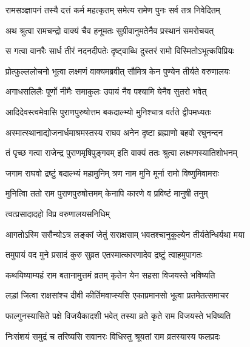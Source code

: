 \twolineshloka
{रामसञ्ज्ञापनं तस्यै दत्तं कर्म महत्कृतम्}
{समेत्य रामेण पुनः सर्व तत्र निवेदितम्} %

\twolineshloka
{अथ श्रुत्वा रामचन्द्रो वाक्यं चैव हनूमतः}
{सुग्रीवानुमतेनैव प्रस्थानं समरोचयत्} %

\twolineshloka
{स गत्वा वानरैः सार्ध तीरं नदनदीपतेः}
{दृष्ट्वाब्धि दुस्तरं रामो विस्मितोऽभूत्कपिप्रियः} %

\twolineshloka
{प्रोत्फुल्ललोचनो भूत्वा लक्ष्मणं वाक्यमब्रवीत्}
{सौमित्र केन पुण्येन तीर्यते वरुणालयः} %

\twolineshloka
{अगाधसलिलैः पूर्णो नीमैः समाकुलः}
{उपायं नैव पश्यामि येनैव सुतरो भवेत्} %


\twolineshloka
{आदिदेवस्त्वमेवासि पुराणपुरुषोत्तम}
{बकदाल्भ्यो मुनिश्चात्र वर्तते द्वीपमध्यतः} %

\twolineshloka
{अस्मात्स्थानाद्योजनार्धमाश्रमस्तस्य राघव}
{अनेन दृष्टा ब्रह्माणो बहवो रघुनन्दन} %

\twolineshloka
{तं पृच्छ गत्वा राजेन्द्र पुराणमृषिपुङ्गवम्}
{इति वाक्यं ततः श्रुत्वा लक्ष्मणस्यातिशोभनम्} %

\twolineshloka
{जगाम राघवो द्रष्टुं बदाल्भ्यं महामुनिम्}
{त्रण नाम मुनि मूर्ना रामो विष्णुमिवामराः} %

\twolineshloka
{मुनित्विा ततो राम पुराणपुरुषोत्तमम्}
{केनापि कारणे व प्रविष्टं मानुषी तनुम्} %



\onelineshloka
{त्वत्प्रसादादहो विप्र वरुणालयसनिधिम्} %

\twolineshloka
{आगतोऽस्मि ससैन्योऽत्र लङ्कां जेतुं सराक्षसाम्}
{भवतश्चानुकूल्येन तीर्यतेन्धिर्यथा मया} %

\twolineshloka
{तमुपायं वद मुने प्रसादं कुरु सुव्रत}
{एतस्मात्कारणादेव द्रष्टुं त्वाहमुपागतः} %


\twolineshloka
{कथयिष्याम्यहं राम बतानामुत्तमं व्रतम्}
{कृतेन येन सहसा विजयस्ते भविष्यति} %

\twolineshloka
{लड़ां जित्वा राक्षसांश्च दीवी कीर्तिमवाप्स्यसि}
{एकाप्रमानसो भूत्वा प्रतमेतत्समाचर} %

\twolineshloka
{फाल्गुनस्यासिते पक्षे विजयैकादशी भवेत्}
{तस्या व्रते कृते राम विजयस्ते भविष्यति} %

\twolineshloka
{निःसंशयं समुद्रं च तरिष्यसि सवानरः}
{विधिस्तु श्रूयतां राम व्रतस्यास्य फलप्रदः} %

